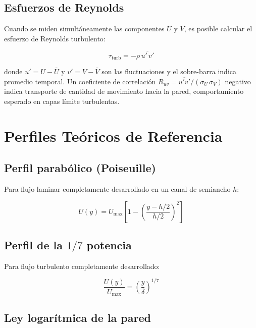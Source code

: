 \documentclass[12pt,a4paper]{article}
\begin{document}
\subsection{Esfuerzos de Reynolds}
\label{subsec:reynolds}

Cuando se miden simultáneamente las componentes $U$ y $V$, es posible
calcular el esfuerzo de Reynolds turbulento:

\begin{equation}
	\tau_\mathrm{turb} = -\rho\,\overline{u'\,v'}
	\label{eq:reynolds_stress}
\end{equation}

donde $u' = U - \bar{U}$ y $v' = V - \bar{V}$ son las fluctuaciones y el
sobre-barra indica promedio temporal.  Un coeficiente de correlación
$R_{uv} = \overline{u'v'}/(\sigma_U\,\sigma_V)$ negativo indica transporte
de cantidad de movimiento hacia la pared, comportamiento esperado en capas
límite turbulentas.

\section{Perfiles Teóricos de Referencia}
\label{sec:perfiles_teoricos}

\subsection{Perfil parabólico (Poiseuille)}

Para flujo laminar completamente desarrollado en un canal de semiancho $h$:

\begin{equation}
	U(y) = U_\mathrm{max}\left[1
		- \left(\frac{y - h/2}{h/2}\right)^2\right]
	\label{eq:Poiseuille}
\end{equation}

\subsection{Perfil de la $1/7$ potencia}

Para flujo turbulento completamente desarrollado:

\begin{equation}
	\frac{U(y)}{U_\mathrm{max}}
	= \left(\frac{y}{\delta}\right)^{1/7}
	\label{eq:1_7_power}
\end{equation}

\subsection{Ley logarítmica de la pared}
\end{document}
